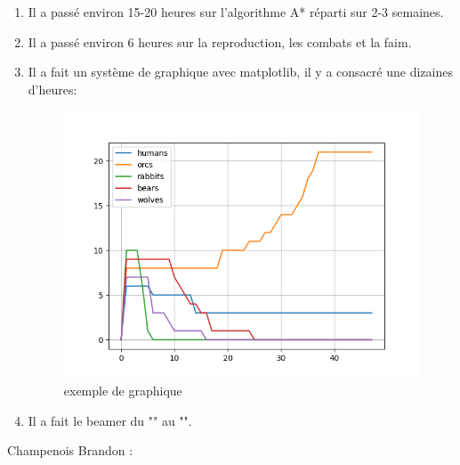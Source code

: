 \documentclass[a4paper, 11pt]{article}
\begin{document}
\begin{enumerate}
\item Il a passé environ 15-20 heures sur l’algorithme  A* réparti sur 2-3 semaines.\\
\item Il a passé environ 6 heures sur la reproduction, les combats et la faim.\\
\item Il a fait un système de graphique avec matplotlib, il y a consacré une dizaines d'heures:\\
\begin{figure}[ht!]
 \centering
 \includegraphics[width=1\linewidth]{images/graph.png}
 \caption{exemple de graphique}
 \label{fig::example::one}
\end{figure}
\item Il a fait le beamer du "" au "".\\
\end{enumerate}
\newpage
Champenois Brandon : \\
\end{document}
